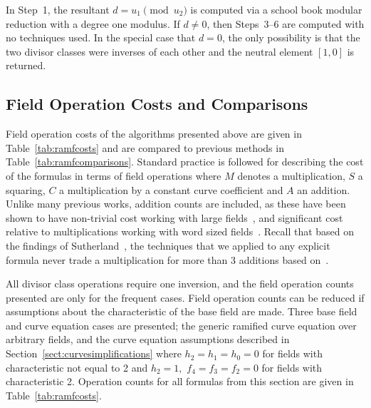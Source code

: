 In Step~1, the resultant $d = u_1 \pmod{u_2}$ is computed via a school book modular
reduction with a degree one modulus. If $d \neq 0$, then Steps~3--6 are computed
with no techniques used. In the special case that $d=0$, the
only possibility is that the two divisor classes were inverses of each other and
the neutral element $[1,0]$ is returned.



\subsection{Field Operation Costs and Comparisons}
\label{sec:ramFieldCosts}

Field operation costs of the algorithms presented above are given in
Table~\ref{tab:ramfcosts} and are compared to previous methods in
Table~\ref{tab:ramfcomparisons}. Standard practice is followed for describing
the cost of the formulas in terms of field operations where $M$ denotes a
multiplication, $S$ a squaring, $C$ a multiplication by a constant curve
coefficient and $A$ an addition. Unlike many previous works, addition counts are
included, as these have been shown to have non-trivial cost working with large
fields~\cite{HisilCostello_jaccoord_2014}, and significant cost relative to
multiplications working with word sized fields~\cite{Sutherland_g3_2019}. Recall
that based on the findings of
Sutherland~\cite{Sutherland_sato_2016,Sutherland_g3_2019}, the techniques that
we applied to any explicit formula never trade a multiplication for more than 3
additions based on~\cite{Sutherland_sato_2016}.

All divisor class operations require one inversion, and the field operation
counts presented are only for the frequent cases. Field operation counts can be
reduced if assumptions about the characteristic of the base field are made.
Three base field and curve equation cases are presented; the generic ramified
curve equation over arbitrary fields, and the curve equation assumptions
described in Section~\ref{sect:curvesimplifications} where $h_2=h_1=h_0=0$ for
fields with characteristic not equal to 2 and $h_2 = 1,$ $f_4 = f_3 = f_2 = 0$
for fields with characteristic 2. Operation counts for all formulas from this
section are given in Table~\ref{tab:ramfcosts}.

